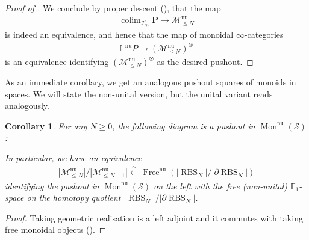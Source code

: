 \documentclass[12pt, reqno]{amsart}
\theoremstyle{plain}
\newtheorem{corollary}[theorem]{Corollary}
\theoremstyle{definition}
\begin{document}
\begin{proof}[Proof of ]
We conclude by proper descent (\cite[Theorem 2.29]{ClausenOrsnesJansen}), that the map
\begin{align*}
\mathop{\operatorname{colim}}_{\mathcal{I}^\circ_\gg} \mathbf{P}\rightarrow \mathscr{M}_{\leq N}^{\operatorname{nu}}
\end{align*}
is indeed an equivalence, and hence that the map of monoidal $\infty$-categories
\begin{align*}
\mathbb{L}^{\operatorname{nu}}P\longrightarrow (\mathscr{M}_{\leq N}^{\operatorname{nu}})^\otimes
\end{align*}
is an equivalence identifying $(\mathscr{M}_{\leq N}^{\operatorname{nu}})^\otimes$ as the desired pushout.
\end{proof}

As an immediate corollary, we get an analogous pushout squares of monoids in spaces. We will state the non-unital version, but the unital variant reads analogously.

\begin{corollary}\label{pushout of non-unital E1-spaces}
For any $N\geq 0$, the following diagram is a pushout in $\operatorname{Mon}^{\operatorname{nu}}(\mathcal{S})$:
\begin{center}
\end{center}
In particular, we have an equivalence
\begin{align*}
|\mathscr{M}^{\operatorname{nu}}_{\leq N}|/|\mathscr{M}^{\operatorname{nu}}_{\leq N-1}| \xleftarrow{\ \simeq\ } \operatorname{Free}^{\operatorname{nu}}(|\operatorname{RBS}_N|/|\partial \operatorname{RBS}_N|)
\end{align*}
identifying the pushout in $\operatorname{Mon}^{\operatorname{nu}}(\mathcal{S})$ on the left with the free (non-unital) $\mathbb{E}_1$-space on the homotopy quotient $|\operatorname{RBS}_N|/|\partial \operatorname{RBS}_N|$.
\end{corollary}
\begin{proof}
Taking geometric realisation is a left adjoint and it commutes with taking free monoidal objects ().
\end{proof}
\end{document}

